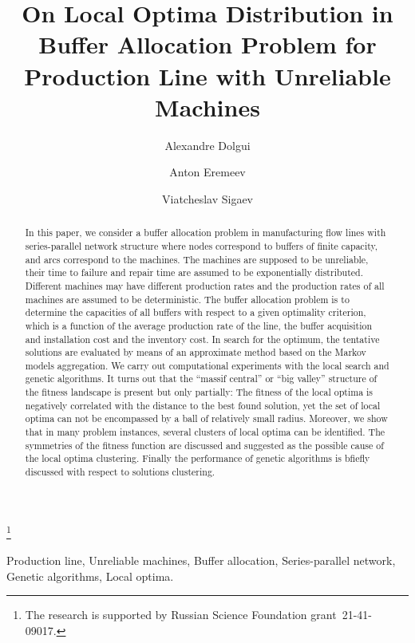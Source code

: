 \documentclass{ifacconf}
\begin{document}
\begin{frontmatter}

\title{On Local Optima Distribution in Buffer Allocation Problem for Production Line with Unreliable Machines} 

\thanks[footnoteinfo]{The research is supported by Russian Science Foundation  grant~21-41-09017.}

\author[First]{Alexandre Dolgui} 
\author[Second]{Anton Eremeev} 
\author[Third]{Viatcheslav Sigaev}

\address[First]{IMT Atlantique, Nantes, France}
\address[Second]{Sobolev Institute of Mathematics SB RAS, Novosibirsk, Russia (e-mail: eremeev@ofim.oscsbras.ru).}
\address[Third]{Avtomatika-Servis LLC, Omsk, Russia (e-mail: sigvs@yandex.ru).}


\begin{abstract}                %
In this paper, we consider a buffer allocation problem in manufacturing flow lines with series-parallel 
network structure where nodes correspond to buffers  of finite capacity, and arcs correspond to the machines. 
The machines are supposed to be unreliable, their time to failure and repair time are
assumed to be exponentially distributed. Different machines may have
different production rates and the production rates of all machines are assumed to be deterministic. 
The buffer allocation problem is to determine the capacities of all buffers with respect to a given
optimality criterion, which is a function of the average production rate
of the line, the buffer acquisition and installation cost and the
inventory cost. In search for the optimum, the tentative solutions are evaluated by means of an
approximate method based on the Markov models aggregation. 
%
We carry out computational experiments with the local search and genetic algorithms.
It turns out that the ``massif central'' or ``big valley'' structure
of the fitness landscape is present but only partially: The fitness of the local optima is negatively correlated with 
the distance to the best found solution, yet the set of local optima can not be encompassed by a ball of relatively small radius. 
Moreover, we show that in many problem instances, several clusters of local optima can be identified. The symmetries of the fitness
function are discussed and suggested as the possible cause of the local optima clustering. 
Finally the performance of genetic algorithms is bfiefly discussed with respect to solutions clustering.

\end{abstract}

\begin{keyword}
Production line, Unreliable machines, Buffer allocation, Series-parallel network, Genetic algorithms, Local optima.
\end{keyword}

\end{frontmatter}
\end{document}
